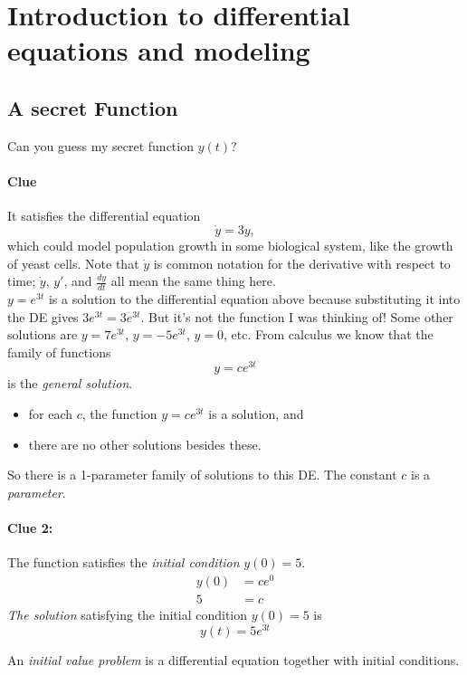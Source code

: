 \section{Introduction to differential equations and modeling}
\subsection{A secret Function}
\begin{example}
  Can you guess my secret function $y(t)$?
\end{example}
\paragraph{Clue} It satisfies the differential equation \\
\begin{equation*}
  \dot{y} = 3y,
\end{equation*}
which could model population growth in some biological system, like the growth of yeast cells.
Note that \emph{\color{blue} $\dot{y}$} is common notation for the derivative with respect to time;
$\dot{y}$, $y'$, and $\frac{dy}{dt}$ all mean the same thing here.\\
$y = e^{3t}$ is a solution to the differential equation above because substituting it into the DE gives
$3e^{3t}=3e^{3t}$. But it's not the function I was thinking of! Some other solutions are
$y = 7e^{3t}$, $y = -5e^{3t}$, $y = 0$, etc. From calculus we know that the family of functions
\begin{equation*}
  y = ce^{3t}
\end{equation*}
is the \emph{\color{blue} general solution}.
\begin{itemize}
\item for each $c$, the function $y=ce^{3t}$ is a solution, and
\item there are no other solutions besides these.
\end{itemize}
So there is a 1-parameter family of solutions to this DE.
The constant $c$ is a \emph{\color{blue} parameter}.

\paragraph{Clue 2:} The function satisfies the \emph{\color{blue} initial condition} $y(0)=5$.
\begin{align*}
  y(0) &= ce^{0} \\
  5 &= c  
\end{align*}
\emph{The solution} satisfying the initial condition $y(0) = 5$ is
\begin{equation*}
  y(t) = 5e^{3t}
\end{equation*}
\begin{mydef}
  An \emph{\color{blue} initial value problem}
  is a differential equation together with initial conditions.
\end{mydef}

